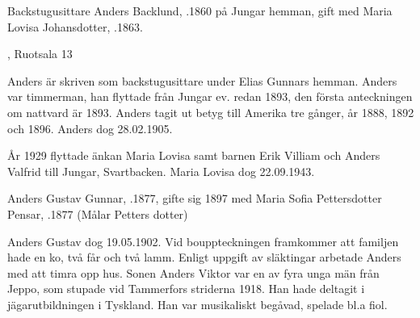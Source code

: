%
Backstugusittare Anders Backlund, .1860 på Jungar hemman, gift med Maria Lovisa Johansdotter, .1863.
\begin{jhchildren}
  \item {}
  \item {}
  \item {}, Ruotsala 13
  \item {}
  \item {}
\end{jhchildren}

Anders är skriven som backstugusittare under Elias Gunnars hemman. Anders var timmerman, han flyttade från Jungar ev. redan 1893, den första anteckningen om nattvard är 1893. Anders tagit ut betyg till Amerika tre gånger, år 1888, 1892 och 1896. Anders dog 28.02.1905.

År 1929 flyttade änkan Maria Lovisa samt barnen Erik Villiam och Anders Valfrid till Jungar, Svartbacken. Maria Lovisa dog 22.09.1943.


%
Anders Gustav Gunnar, .1877, gifte sig 1897 med Maria Sofia Pettersdotter Pensar, .1877 (Målar Petters dotter)
\begin{jhchildren}
  \item {}
  \item {}
  \item {}
\end{jhchildren}

Anders Gustav dog 19.05.1902. Vid bouppteckningen framkommer att familjen hade en ko, två får och två lamm. Enligt uppgift av släktingar arbetade Anders med att timra opp hus. Sonen Anders Viktor var en av fyra unga män från Jeppo, som stupade vid Tammerfors striderna 1918. Han hade deltagit i jägarutbildningen i Tyskland. Han var musikaliskt begåvad, spelade bl.a fiol.


